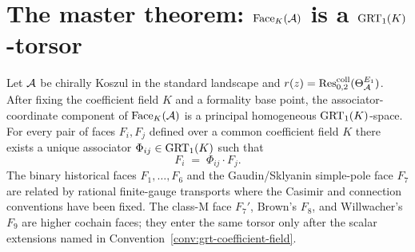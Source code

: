 \section{The master theorem: \texorpdfstring{$\mathrm{Face}_K(\mathcal{A})$}{Face_K(A)} is a
$\mathrm{GRT}_1(K)$-torsor}
\label{sec:grt-torsor-thm}

\begin{theorem}
Let $\mathcal{A}$ be chirally Koszul in the standard landscape and
$r(z) = \operatorname{Res}^{\mathrm{coll}}_{0,2}(\Theta_{\mathcal{A}}^{E_1})$. After fixing the
coefficient field $K$ and a formality base point, the
associator-coordinate component of $\mathrm{Face}_K(\mathcal{A})$ is a principal
homogeneous $\mathrm{GRT}_1(K)$-space. For every pair of faces $F_i,F_j$ defined
over a common coefficient field $K$ there exists a unique associator
$\Phi_{ij}\in\mathrm{GRT}_1(K)$ such that
\[
 F_i \;=\; \Phi_{ij}\cdot F_j.
\]
The binary historical faces $F_1,\dots,F_6$ and the Gaudin/Sklyanin
simple-pole face $F_7$ are related by rational finite-gauge transports
where the Casimir and connection conventions have been fixed.
The class-M face $F_7'$, Brown's $F_8$, and Willwacher's $F_9$ are
higher cochain faces; they enter the same torsor only after the scalar
extensions named in Convention~\ref{conv:grt-coefficient-field}.
\end{theorem}

